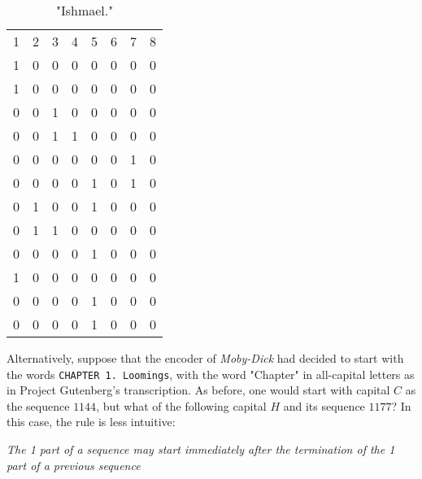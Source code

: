 \documentclass{article}
\begin{document}
\begin{table}
    \centering
    \begin{tabular}{cccccccc}
        1 & 2 & 3 & 4 & 5 & 6 & 7 & 8\\
        1 & 0 & 0 & 0 & 0 & 0 & 0 & 0\\
        1 & 0 & 0 & 0 & 0 & 0 & 0 & 0\\
        0 & 0 & 1 & 0 & 0 & 0 & 0 & 0\\
        0 & 0 & 1 & 1 & 0 & 0 & 0 & 0\\
        0 & 0 & 0 & 0 & 0 & 0 & 1 & 0\\
        0 & 0 & 0 & 0 & 1 & 0 & 1 & 0\\
        0 & 1 & 0 & 0 & 1 & 0 & 0 & 0\\
        0 & 1 & 1 & 0 & 0 & 0 & 0 & 0\\
        0 & 0 & 0 & 0 & 1 & 0 & 0 & 0\\
        1 & 0 & 0 & 0 & 0 & 0 & 0 & 0\\
        0 & 0 & 0 & 0 & 1 & 0 & 0 & 0\\
        0 & 0 & 0 & 0 & 1 & 0 & 0 & 0\\
    \end{tabular}
    \caption{"Ishmael."}
    \label{tab:my_label}
\end{table}

Alternatively, suppose that the encoder of \textit{Moby-Dick} had decided to start with the words \verb|CHAPTER 1. Loomings|, with the word "Chapter" in all-capital letters as in Project Gutenberg's transcription.  As before, one would start with capital $C$ as the sequence $1144$, but what of the following capital $H$ and its sequence $1177$?  In this case, the rule is less intuitive:

\emph{The 1 part of a sequence may start immediately after the termination of the 1 part of a previous sequence}
\end{document}

